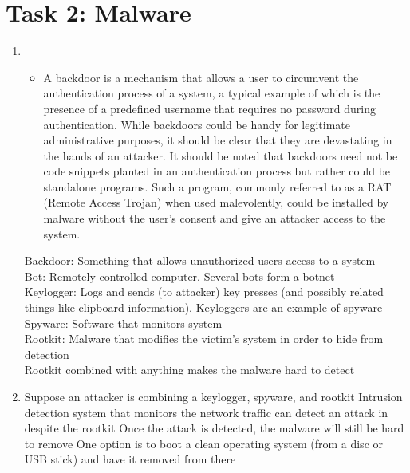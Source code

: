\section*{Task 2: Malware}
\begin{enumerate}
\item %
  \begin{itemize}
  \item A backdoor is a mechanism that allows a user to circumvent the authentication process of a system, a typical example of which is the presence of a predefined username that requires no password during authentication. While backdoors could be handy for legitimate administrative purposes, it should be clear that they are devastating in the hands of an attacker. It should be noted that backdoors need not be code snippets planted in an authentication process but rather could be standalone programs. Such a program, commonly referred to as a RAT (Remote Access Trojan) when used malevolently, could be installed by malware without the user's consent and give an attacker access to the system.\cite{aycock06}
  \end{itemize}
  Backdoor: Something that allows unauthorized users access to a system\\
  Bot: Remotely controlled computer. Several bots form a botnet\\
  Keylogger: Logs and sends (to attacker) key presses (and possibly related things like clipboard information). Keyloggers are an example of spyware\\
  Spyware: Software that monitors system\\
  Rootkit: Malware that modifies the victim's system in order to hide from detection\\

  Rootkit combined with anything makes the malware hard to detect
\item %
  Suppose an attacker is combining a keylogger, spyware, and rootkit
Intrusion detection system that monitors the network traffic can detect an attack in despite the rootkit
Once the attack is detected, the malware will still be hard to remove
One option is to boot a clean operating system (from a disc or USB stick) and have it removed from there
  
\end{enumerate}
